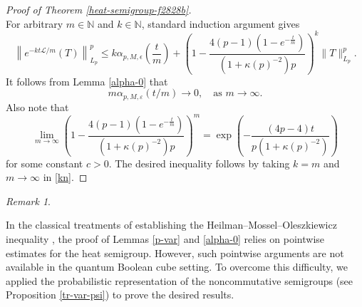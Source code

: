 \documentclass{amsbook}
\theoremstyle{definition}
\theoremstyle{remark}
\newtheorem{remark}[theorem]{Remark}
\numberwithin{section}{chapter}
\numberwithin{equation}{chapter}
\newcommand{\1}{\mathbf{1}}
\begin{document}
\begin{proof}[Proof of Theorem \ref{heat-semigroup-f2828b}]
\begin{equation*}
\end{equation*}
For arbitrary $m\in \mathbb{N}$ and $k\in\mathbb{N}$, standard induction argument gives
\begin{equation}\label{kn}
\left\|e^{-kt\mathcal{L}/m}(T)\right\|^{p}_{L_{p}}\leq k \alpha_{p,M,\epsilon}\left(\frac{t}{m}\right)+\left(1-\frac{4(p-1)(1-e^{-\frac t m})}{(1+\kappa(p)^{-2})p}\right)^k\|T\|^{p}_{L_{p}}.
\end{equation}
It follows from Lemma \ref{alpha-0} that
\begin{equation*}\label{limit-1}
m\alpha_{p,M,\varepsilon}(t/m)\to 0,\quad
\mbox{as }m\to\infty.
\end{equation*}
Also note that
\[
\lim_{m\to\infty}\left(1-\frac{4(p-1)(1-e^{-\frac t m})}{(1+\kappa(p)^{-2})p}\right)^{m}=\exp\left(-\frac{(4p-4)t}{p(1+\kappa(p)^{-2})}\right)
\]
for some constant $c>0$. The desired inequality follows by taking $k=m$ and $m\to\infty$ in \eqref{kn}.
\end{proof} 

\begin{remark}\label{rem-hmo}

In the classical treatments of establishing the Heilman--Mossel--Oleszkiewicz inequality \cite{HMO2017}, the proof of Lemmas \ref{p-var} and \ref{alpha-0} relies on pointwise estimates for the heat semigroup. However, such pointwise arguments are not available in the quantum Boolean cube setting. To overcome this difficulty, we applied the probabilistic representation of  the noncommutative semigroups (see Proposition \ref{tr-var-psi})  to prove the desired results.
\end{remark}
\end{document}
